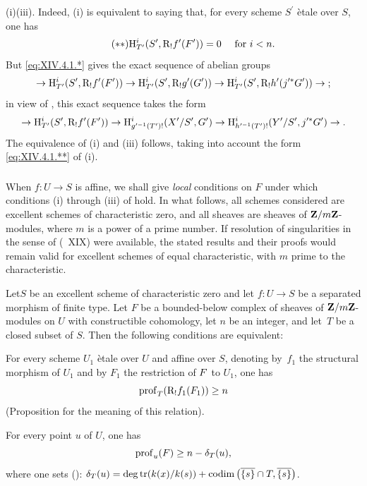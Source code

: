 \textup{(i)}\SSI\textup{(iii)}. Indeed, \textup{(i)} is equivalent to saying that, for every scheme $S^{\prime}$ \`etale over $S$, one has
\begin{equation*} \label{eq:XIV.4.1.**} \tag{$**$} {\H_{T^{\prime}}^{i}(S^{\prime}, \R_{!}f^{\prime}(F^{\prime}))=0\quad\textrm{ for }i<n.}
\end{equation*}
But \eqref{eq:XIV.4.1.*} gives the exact sequence of abelian groups
$$
\to\H_{T^{\prime}}^{i}(S^{\prime}, \R_{!}f^{\prime}(F^{\prime}))\to\H_{T^{\prime}}^{i}(S^{\prime}, \R_{!}g^{\prime}(G^{\prime}))\to \H_{T^{\prime}}^{i}(S^{\prime}, \R_{!}h^{\prime}(j^{\prime\ast}G^{\prime}))\to\;;$$
in view of , this exact sequence takes the form
$$
\to\H_{T^{\prime}}^{i}(S^{\prime}, \R_{!}f^{\prime}(F^{\prime}))\to\H_{g^{\prime -1}(T^{\prime})!}^{i}(X^{\prime}/S^{\prime}, G^{\prime})\to\H_{h^{\prime -1}(T^{\prime})!}^{i}(Y^{\prime}/S^{\prime}, j^{\prime\ast}G^{\prime})\sisi{}{\to.}$$
The equivalence of \textup{(i)} and \textup{(iii)} follows, taking into account the form \eqref{eq:XIV.4.1.**} of \textup{(i)}.

\setcounter{subsubsection}{-1} \setcounter{subsection}{2}

\subsubsection{} \label{XIV.4.2.0}
When $f\colon U\to S$ is affine, we shall give \emph{local} conditions on $F$ under which conditions \textup{(i)} through \textup{(iii)} of  hold. In what follows, all schemes considered are excellent schemes of characteristic zero, and all sheaves are sheaves of $\ZZ/m\ZZ$-modules, where $m$ is a power of a prime number. If resolution of singularities in the sense of (~XIX) were available, the stated results and their proofs would remain valid for excellent schemes of equal characteristic, with $m$ prime to the characteristic.

\setcounter{subsection}{1}

\begin{theoreme} \label{XIV.4.2}
Let\pageoriginale $S$ be an excellent scheme of characteristic zero and let \hbox{$f\colon U\!\to\! S$} be a separated morphism of finite type. Let $F$ be a bounded-below complex of sheaves of $\ZZ/m\ZZ$-modules on $U$ with constructible cohomology, let $n$ be an integer, and let~$T$ be a closed subset of $S$. Then the following conditions are equivalent:
\begin{enumeratei}
\item
For every scheme $U_{1}$ \`etale over $U$ and affine over $S$, denoting by~$f_{1}$ the structural morphism of $U_{1}$ and by $F_{1}$ the restriction of $F\sisi{_{1}}{}$ to $U_{1}$, one has
$$
\prof_{T}(\R_{!}f_{1}(F_{1}))\geq n$$
(\cf Proposition\ptbl {} for the meaning of this relation).
\item
For every point $u$ of $U$, one has
$$
\prof_{u}(F)\geq n-\delta_{T}(u),
$$
where one sets (\cf {}): $\delta_{T}(u)=\degtr(k(x)/k(s))+\codim\big(\overline{\{ s\} }\cap T, \overline{\{ s\} } \big)$.
\end{enumeratei}
\end{theoreme}

